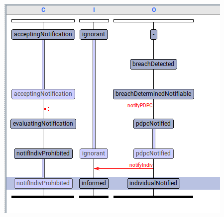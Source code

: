 \documentclass{beamer}
\begin{document}
\begin{frame}[fragile]
\begin{columns}
\begin{center}
    \includegraphics[scale=0.35]{Figures/uppaal_swimlane.png}
  \end{center}
\end{columns}

\end{frame}



\end{document}
